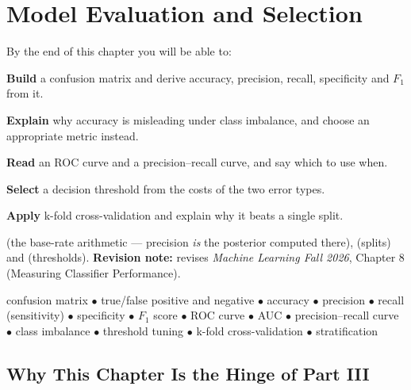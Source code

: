 \chapter{Model Evaluation and Selection}\label{ch:evaluation}

\begin{outcomes}
By the end of this chapter you will be able to:
\begin{tight}
  \item \textbf{Build} a confusion matrix and derive accuracy, precision, recall, specificity and $F_1$ from it.
  \item \textbf{Explain} why accuracy is misleading under class imbalance, and choose an appropriate metric instead.
  \item \textbf{Read} an ROC curve and a precision--recall curve, and say which to use when.
  \item \textbf{Select} a decision threshold from the costs of the two error types.
  \item \textbf{Apply} k-fold cross-validation and explain why it beats a single split.
\end{tight}
\end{outcomes}

\begin{prereq}
 (the base-rate arithmetic --- precision \emph{is} the posterior
computed there),  (splits) and 
(thresholds). \textbf{Revision note:} revises \emph{Machine Learning Fall 2026},
Chapter 8 (Measuring Classifier Performance).
\end{prereq}

\begin{keyterms}
confusion matrix $\bullet$ true/false positive and negative $\bullet$ accuracy
$\bullet$ precision $\bullet$ recall (sensitivity) $\bullet$ specificity $\bullet$
$F_1$ score $\bullet$ ROC curve $\bullet$ AUC $\bullet$ precision--recall curve
$\bullet$ class imbalance $\bullet$ threshold tuning $\bullet$ k-fold
cross-validation $\bullet$ stratification
\end{keyterms}

\section{Why This Chapter Is the Hinge of Part III}

